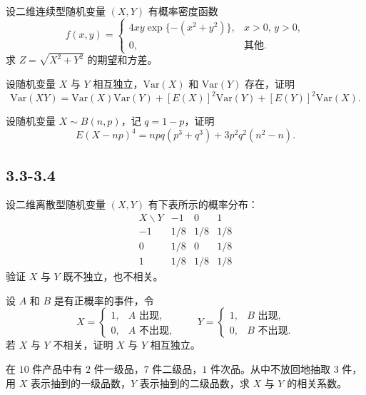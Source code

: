 \begin{homework}[3.22]
设二维连续型随机变量 $(X,Y)$ 有概率密度函数
\[
f(x,y)=
\begin{cases}
4xy\exp\{-(x^2+y^2)\}, & x>0,\,y>0,\\[4pt]
0, & \text{其他}.
\end{cases}
\]
求 $Z=\sqrt{X^2+Y^2}$ 的期望和方差。
\end{homework}

\begin{homework}[3.23]
设随机变量 $X$ 与 $Y$ 相互独立，$\mathrm{Var}(X)$ 和 $\mathrm{Var}(Y)$ 存在，证明
\[
\mathrm{Var}(XY)
=\mathrm{Var}(X)\mathrm{Var}(Y)
+[E(X)]^2\mathrm{Var}(Y)
+[E(Y)]^2\mathrm{Var}(X).
\]
\end{homework}
\begin{homework}[3.24]
设随机变量 $X\sim B(n,p)$，记 $q=1-p$，证明
\[
E(X-np)^4
=npq(p^3+q^3)+3p^2q^2(n^2-n).
\]
\end{homework}
\subsection*{3.3-3.4}
\begin{homework}[3.25]
设二维离散型随机变量 $(X,Y)$ 有下表所示的概率分布：
\[
\begin{array}{c|ccc}
  X \backslash Y & -1 & 0 & 1 \\ \hline
  -1 & 1/8 & 1/8 & 1/8 \\
   0 & 1/8 & 0   & 1/8 \\
   1 & 1/8 & 1/8 & 1/8
\end{array}
\]
验证 $X$ 与 $Y$ 既不独立，也不相关。
\end{homework}

\begin{homework}[3.26]
设 $A$ 和 $B$ 是有正概率的事件，令
\[
X=
\begin{cases}
1, & A\text{ 出现},\\
0, & A\text{ 不出现},
\end{cases}
\qquad
Y=
\begin{cases}
1, & B\text{ 出现},\\
0, & B\text{ 不出现}.
\end{cases}
\]
若 $X$ 与 $Y$ 不相关，证明 $X$ 与 $Y$ 相互独立。
\end{homework}

\begin{homework}[3.28]
在 $10$ 件产品中有 $2$ 件一级品，$7$ 件二级品，$1$ 件次品。从中不放回地抽取 $3$ 件，
用 $X$ 表示抽到的一级品数，$Y$ 表示抽到的二级品数，求 $X$ 与 $Y$ 的相关系数。
\end{homework}

